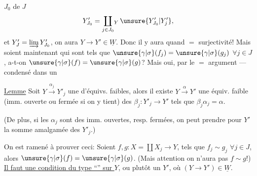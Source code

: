 $J_0$ de $J$
\[
Y'_{J_0}=\coprod_{j\in J_0}\!{}_Y\,\unsure{Y'_{J_0}|Y'_j},
\]
et $Y'_J=\varinjlim Y'_{J_0}$, on aura $Y\longrightarrow Y'\in\underline W$. Donc il y aura quand $=$ surjectivité! Mais soient maintenant
qui  sont tels que $\unsure{\gamma|\sigma}(f_j)=\unsure{\gamma|\sigma}(g_j)$ $\forall j\in J$, a-t-on $\unsure{\gamma|\sigma}(f)=\unsure{\gamma|\sigma}(g)$? Mais oui, par le $=$ argument --- condensé dans un


\uline{Lemme} Soit $Y\xrightarrow{\alpha_j}Y'_j$  une  d'équivs. faibles, alors il existe $Y\xrightarrow{\alpha}Y'$ une équiv. faible   (imm. ouverte ou fermée si on y tient)  des $\beta_j:Y'_j\longrightarrow Y'$ tels que $\beta_j\alpha_j=\alpha$.


(De plus, si les $\alpha_j$ sont des imm. ouvertes, resp. fermées, on peut prendre pour $Y'$ la somme amalgamée des $Y'_j$.)

On est ramené à prouver ceci: Soient $f,g:X=\coprod X_j\longrightarrow Y$, tels que $f_j\sim g_j$ $\forall j\in J$, alors $\unsure{\gamma|\sigma}(f)=\unsure{\gamma|\sigma}(g)$. (Mais attention on n'aura pas $f\sim g$!) \uline{Il faut une condition du type ``'' sur $Y$}, ou plutôt un $Y'$, où $(Y\longrightarrow Y')\in\underline W$.
